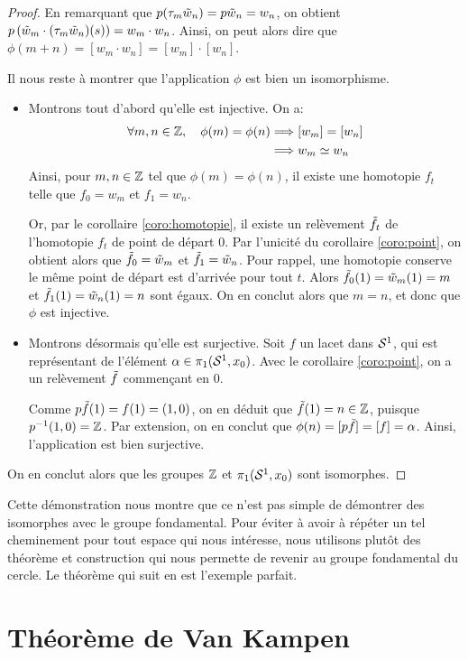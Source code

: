 \documentclass[hidelinks, 10pt]{article}
\begin{document}
\begin{proof}
En remarquant que $p(\tau_m\Tilde{w}_n)=p\Tilde{w}_n=w_n$, on obtient $p\left(\Tilde{w}_m\cdot(\tau_m\Tilde{w}_n)(s)\right)=w_m\cdot w_n$. Ainsi, on peut alors dire que $\phi(m+n)=[w_m\cdot w_n]=[w_m]\cdot[w_n]$.

\bigskip Il nous reste à montrer que l'application $\phi$ est bien un isomorphisme.\begin{itemize}
    \item Montrons tout d'abord qu'elle est injective. On a: \[\begin{split}
    \forall m,n\in\mathbb{Z},\quad\phi(m)=\phi(n)&\Longrightarrow[w_m]=[w_n]\\
    &\Longrightarrow w_m\simeq w_n
    \end{split}\]Ainsi, pour $m,n\in\mathbb{Z}$ tel que $\phi(m)=\phi(n)$, il existe une homotopie $f_t$ telle que $f_0=w_m$ et $f_1=w_n$. 
    
    Or, par le corollaire \ref{coro:homotopie}, il existe un relèvement $\Tilde{f}_t$ de l'homotopie $f_t$ de point de départ 0. Par l'unicité du corollaire \ref{coro:point}, on obtient alors que $\Tilde{f}_0=\Tilde{w}_m$ et $\Tilde{f}_1=\Tilde{w}_n$. Pour rappel, une homotopie conserve le même point de départ est d'arrivée pour tout $t$. Alors $\Tilde{f}_0(1)=\Tilde{w}_m(1)=m$ et $\Tilde{f}_1(1)=\Tilde{w}_n(1)=n$ sont égaux. On en conclut alors que $m=n$, et donc que $\phi$ est injective.
    \item Montrons désormais qu'elle est surjective. Soit $f$ un lacet dans $\mathcal{S}^{1}$, qui est représentant de l'élément $\alpha\in\pi_1(\mathcal{S}^{1},x_0)$. Avec le corollaire \ref{coro:point}, on a un relèvement $\Tilde{f}$ commençant en 0. 
    
    Comme $p\Tilde{f}(1)=f(1)=(1,0)$, on en déduit que $\Tilde{f}(1)=n\in\mathbb{Z}$, puisque $p^{-1}(1,0)=\mathbb{Z}$. Par extension, on en conclut que $\phi(n)=[p\Tilde{f}]=[f]=\alpha$. Ainsi, l'application est bien surjective.
\end{itemize}
On en conclut alors que les groupes $\mathbb{Z}$ et $\pi_1(\mathcal{S}^{1},x_0)$ sont isomorphes.
\end{proof}

Cette démonstration nous montre que ce n'est pas simple de démontrer des isomorphes avec le groupe fondamental. Pour éviter à avoir à répéter un tel cheminement pour tout espace qui nous intéresse, nous utilisons plutôt des théorème et construction qui nous permette de revenir au groupe fondamental du cercle. Le théorème qui suit en est l'exemple parfait.

\section{Théorème de Van Kampen}
\end{document}
